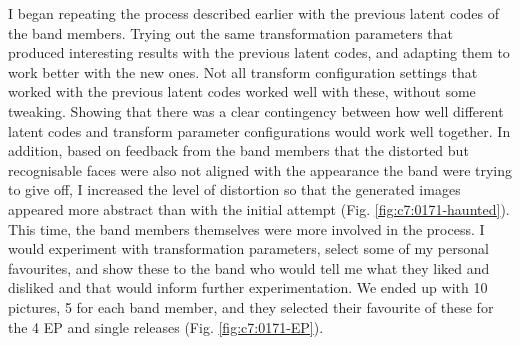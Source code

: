 I began repeating the process described earlier with the previous latent codes of the band members. 
Trying out the same transformation parameters that produced interesting results with the previous latent codes, and adapting them to work better with the new ones. 
Not all transform configuration settings that worked with the previous latent codes worked well with these, without some tweaking. 
Showing that there was a clear contingency between how well different latent codes and transform parameter configurations would work well together.
In addition, based on feedback from the band members that the distorted but recognisable faces were also not aligned with the appearance the band were trying to give off, I increased the level of distortion so that the generated images appeared more abstract than with the initial attempt  (Fig. \ref{fig:c7:0171-haunted}). 
This time, the band members themselves were more involved in the process. I would experiment with transformation parameters, select some of my personal favourites, and show these to the band who would tell me what they liked and disliked and that would inform further experimentation. 
We ended up with 10 pictures, 5 for each band member, and they selected their favourite of these for the 4 EP and single releases  (Fig. \ref{fig:c7:0171-EP}). 

